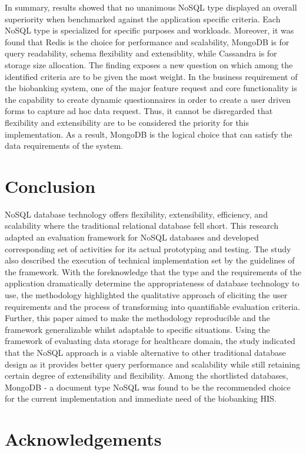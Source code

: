 \documentclass[5p]{elsarticle}
\begin{document}
	
In summary, results showed that no unanimous NoSQL type displayed an overall superiority when benchmarked against the application specific criteria. 
Each NoSQL type is specialized for specific purposes and workloads.
Moreover, it was found that Redis is the choice for performance and scalability, MongoDB is for query readability, schema flexibility and extensiblity, while Cassandra is for storage size allocation.
The finding exposes a new question on which among the identified criteria are to be given the most weight. 
In the business requirement of the biobanking system, one of the major feature request and core functionality is the capability to create dynamic questionnaires in order to create a user driven forms to capture ad hoc data request. 
Thus, it cannot be disregarded that flexibility and extensibility are to be considered the priority for this implementation.
As a result, MongoDB is the logical choice that can satisfy the data requirements of the system.


\section{Conclusion}
NoSQL database technology offers flexibility, extensibility, efficiency, and scalability where the traditional relational database fell short. 
This research adapted an evaluation framework for NoSQL databases and developed corresponding set of activities for its actual prototyping and testing. 
The study also described the execution of technical implementation set by the guidelines of the framework. With the foreknowledge that the type and 
the requirements of the application dramatically determine the appropriateness of database technology to use, the methodology highlighted the 
qualitative approach of eliciting the user requirements and the process of transforming into quantifiable evaluation criteria. 
Further, this paper aimed to make the methodology reproducible and the framework generalizable whilst adaptable to specific situations. 
Using the framework of evaluating data storage for healthcare domain, the study indicated that the NoSQL approach is a viable alternative to 
other traditional database design as it provides better query performance and scalability while still retaining certain degree of extensibility and flexibility. 
Among the shortlisted databases, MongoDB - a document type NoSQL was found to be the recommended choice for the current implementation and immediate need of the biobanking HIS.

\section*{Acknowledgements}
\end{document}
